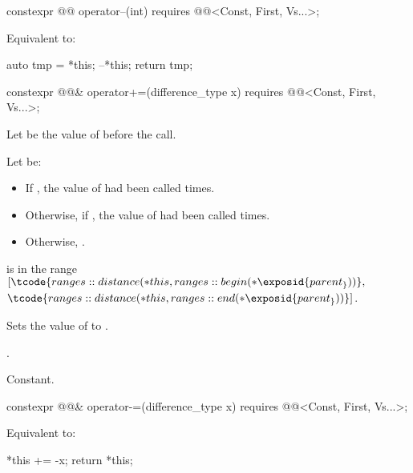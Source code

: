 \begin{itemdecl}
constexpr @@ operator--(int)
  requires @@<Const, First, Vs...>;
\end{itemdecl}

\begin{itemdescr}
\pnum
\effects
Equivalent to:
\begin{codeblock}
auto tmp = *this;
--*this;
return tmp;
\end{codeblock}
\end{itemdescr}

\begin{itemdecl}
constexpr @@& operator+=(difference_type x)
  requires @@<Const, First, Vs...>;
\end{itemdecl}

\begin{itemdescr}
\pnum
Let  be the value of  before the call.

Let  be:
\begin{itemize}
\item
If ,
the value of  had  been called  times.
\item
Otherwise, if ,
the value of  had  been called  times.
\item
Otherwise, .
\end{itemize}

\pnum
\expects
{} is in the range
$[\tcode{ranges::distance(*this, ranges::begin(*\exposid{parent_}))},$\newline
$\tcode{ranges::distance(*this, ranges::end(*\exposid{parent_}))}]$.

\pnum
\effects
Sets the value of  to .

\pnum
\returns
{}.

\pnum
\complexity
Constant.
\end{itemdescr}

\begin{itemdecl}
constexpr @@& operator-=(difference_type x)
  requires @@<Const, First, Vs...>;
\end{itemdecl}

\begin{itemdescr}
\pnum
\effects
Equivalent to:
\begin{codeblock}
*this += -x;
return *this;
\end{codeblock}
\end{itemdescr}

